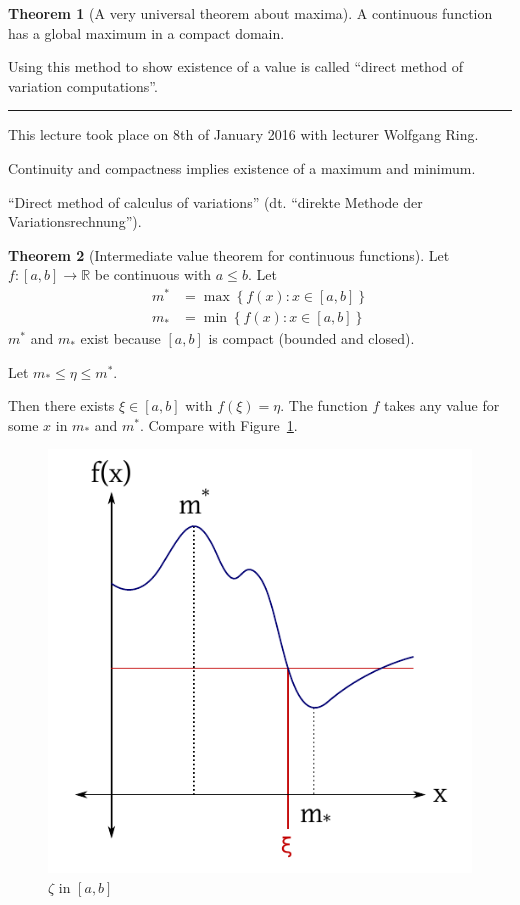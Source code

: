 \documentclass[a4paper,landscape,twocolumn]{article}
\theoremstyle{definition}
\newtheorem{theorem}{Theorem}
\newcommand\set[1]{\left\{#1\right\}}
\newcommand\meta[3]{\hrule{} This #1 took place on #2 with lecturer #3.\par}
\begin{document}
\begin{theorem}[A very universal theorem about maxima]
  A continuous function has a global maximum in a compact domain.
\end{theorem}

Using this method to show existence of a value is called
\enquote{direct method of variation computations}.

\meta{lecture}{8th of January 2016}{Wolfgang Ring}
%
Continuity and compactness implies existence of a maximum and minimum.

\enquote{Direct method of calculus of variations} (dt. \foreignlanguage{ngerman}{\enquote{direkte Methode der Variationsrechnung}}).

\begin{theorem}[Intermediate value theorem for continuous functions]
  Let $f: [a, b] \to \mathbb R$ be continuous with $a \leq b$. Let
  \begin{align*}
    m^* &= \max\set{f(x): x \in [a, b]} \\
    m_* &= \min\set{f(x): x \in [a, b]}
  \end{align*}
  $m^*$ and $m_*$ exist because $[a, b]$ is compact (bounded and closed).

  Let $m_* \leq \eta \leq m^*$.

  Then there exists $\xi \in [a, b]$ with $f(\xi) = \eta$.
  The function $f$ takes any value for some $x$ in $m_*$ and $m^*$.
  Compare with Figure~\ref{img:zeta-in-ab}.

  \begin{figure}[!h]
    \begin{center}
      \includegraphics{img/zeta_in_ab_interval.pdf}
      \caption{$\zeta$ in $[a, b]$}
      \label{img:zeta-in-ab}
    \end{center}
  \end{figure}
\end{theorem}
\end{document}

